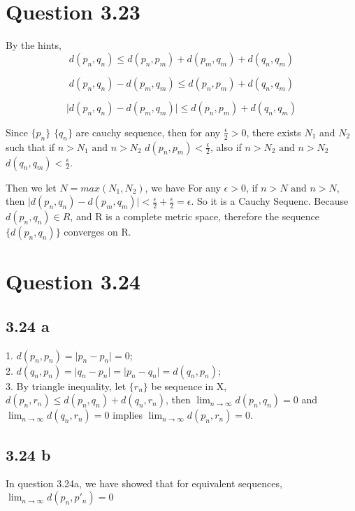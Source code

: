 \documentclass{article}
\begin{document}

\section*{Question 3.23}
By the hints,
$$ d(p_n, q_n) \leq d(p_n, p_m) + d(p_m, q_m)+ d(q_n, q_m)$$

$$ d(p_n, q_n) -  d(p_m, q_m) \leq d(p_n, p_m) + d(q_n, q_m)$$

$$ \vert d(p_n, q_n) -  d(p_m, q_m) \vert \leq d(p_n, p_m) + d(q_n, q_m)$$

Since $\{ p_n \} $ $\{ q_n \} $ are cauchy sequence, then for any $\frac{\epsilon}{2}> 0$, there exists $N_1$ and $N_2$ such that if $n > N_1 \text{ and } n>N_2$ $d(p_n, p_m) < \frac{\epsilon}{2}$, also
if $n > N_2 \text{ and } n>N_2$ $d(q_n, q_m) < \frac{\epsilon}{2}$.

Then we let $N = max(N_1, N_2)$, we have For any $\epsilon > 0$, if  $n > N \text{ and } n>N$, then  $ \vert d(p_n, q_n) -  d(p_m, q_m) \vert < \frac{\epsilon}{2}+ \frac{\epsilon}{2} = \epsilon $. So it is a Cauchy Sequenc.
Because $d(p_n, q_n) \in R$, and R is a complete metric space, therefore the  sequence $\{d(p_n, q_n)\}$ converges on R.


\section*{Question 3.24}
\subsection*{3.24 a}
1. $d(p_n, p_n)= \vert p_n - p_n \vert = 0$;\\
2. $d(q_n, p_n)=  \vert q_n - p_n \vert =  \vert p_n - q_n \vert = d(q_n, p_n)$;\\
3. By triangle inequality, let $\{ r_n \} $ be sequence in X, $d(p_n, r_n) \leq d(p_n, q_n) + d(q_n, r_n)$,
then $\lim_{n\rightarrow \infty} d(p_n, q_n) = 0 $ and $\lim_{n\rightarrow \infty} d(q_n, r_n) = 0 $ implies $\lim_{n\rightarrow \infty} d(p_n, r_n) = 0 $.

\subsection*{3.24 b}
In question 3.24a, we have showed that for equivalent sequences, $ \lim_{n\rightarrow \infty} d(p_n, p'_n) = 0$
\end{document}
